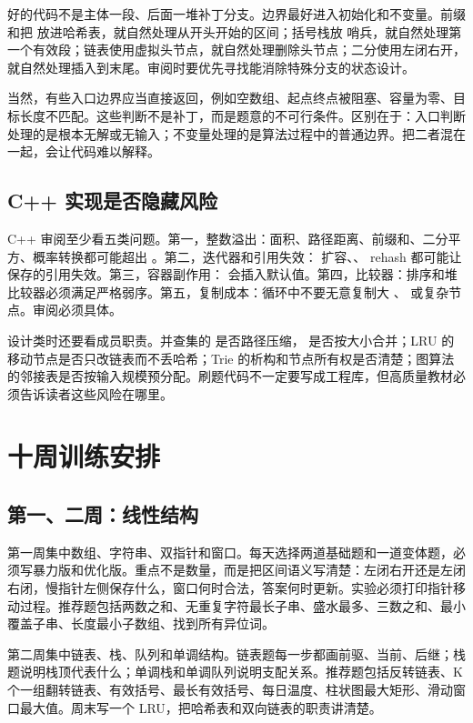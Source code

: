 好的代码不是主体一段、后面一堆补丁分支。边界最好进入初始化和不变量。前缀和把  放进哈希表，就自然处理从开头开始的区间；括号栈放  哨兵，就自然处理第一个有效段；链表使用虚拟头节点，就自然处理删除头节点；二分使用左闭右开，就自然处理插入到末尾。审阅时要优先寻找能消除特殊分支的状态设计。

当然，有些入口边界应当直接返回，例如空数组、起点终点被阻塞、容量为零、目标长度不匹配。这些判断不是补丁，而是题意的不可行条件。区别在于：入口判断处理的是根本无解或无输入；不变量处理的是算法过程中的普通边界。把二者混在一起，会让代码难以解释。

\subsection{C++ 实现是否隐藏风险}

C++ 审阅至少看五类问题。第一，整数溢出：面积、路径距离、前缀和、二分平方、概率转换都可能超出 。第二，迭代器和引用失效： 扩容、、 rehash 都可能让保存的引用失效。第三，容器副作用： 会插入默认值。第四，比较器：排序和堆比较器必须满足严格弱序。第五，复制成本：循环中不要无意复制大 、 或复杂节点。审阅必须具体。

设计类时还要看成员职责。并查集的  是否路径压缩， 是否按大小合并；LRU 的移动节点是否只改链表而不丢哈希；Trie 的析构和节点所有权是否清楚；图算法的邻接表是否按输入规模预分配。刷题代码不一定要写成工程库，但高质量教材必须告诉读者这些风险在哪里。

\section{十周训练安排}

\subsection{第一、二周：线性结构}

第一周集中数组、字符串、双指针和窗口。每天选择两道基础题和一道变体题，必须写暴力版和优化版。重点不是数量，而是把区间语义写清楚：左闭右开还是左闭右闭，慢指针左侧保存什么，窗口何时合法，答案何时更新。实验必须打印指针移动过程。推荐题包括两数之和、无重复字符最长子串、盛水最多、三数之和、最小覆盖子串、长度最小子数组、找到所有异位词。

第二周集中链表、栈、队列和单调结构。链表题每一步都画前驱、当前、后继；栈题说明栈顶代表什么；单调栈和单调队列说明支配关系。推荐题包括反转链表、K 个一组翻转链表、有效括号、最长有效括号、每日温度、柱状图最大矩形、滑动窗口最大值。周末写一个 LRU，把哈希表和双向链表的职责讲清楚。

